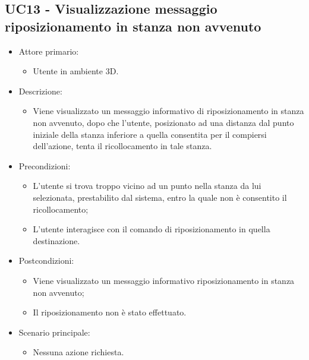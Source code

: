 \subsection{UC13 - Visualizzazione messaggio riposizionamento in stanza non avvenuto}
\begin{itemize}

	\item Attore primario: 
	\begin{itemize}
		\item Utente in ambiente 3D.
	\end{itemize}
	\item Descrizione:
	\begin{itemize}
		\item Viene visualizzato un messaggio informativo di riposizionamento in stanza non avvenuto, dopo che l'utente, posizionato ad
una distanza dal punto iniziale della stanza inferiore a quella consentita per il compiersi dell'azione, tenta il ricollocamento in tale stanza.
	\end{itemize}
	
	\item Precondizioni:
	\begin{itemize}
		\item L'utente si trova troppo vicino ad un punto nella stanza da lui selezionata, prestabilito dal sistema, entro la quale non è consentito il ricollocamento;
		\item L'utente interagisce con il comando di riposizionamento in quella destinazione.
	\end{itemize}
	
	\item Postcondizioni:
	\begin{itemize}
		\item Viene visualizzato un messaggio informativo riposizionamento in stanza non avvenuto;
		\item Il riposizionamento non è stato effettuato.
	\end{itemize}
	
	\item Scenario principale:
	\begin{itemize}
		\item Nessuna azione richiesta.
	\end{itemize}
	
\end{itemize}

\pagebreak

